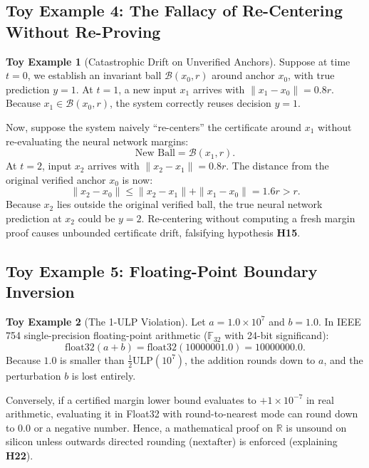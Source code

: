 \documentclass[11pt,article]{article}
\theoremstyle{definition}
\newtheorem{toyexample}{Toy Example}
\begin{document}
\subsection{Toy Example 4: The Fallacy of Re-Centering Without Re-Proving}
\begin{toyexample}[Catastrophic Drift on Unverified Anchors]
Suppose at time $t=0$, we establish an invariant ball $\mathcal{B}(x_0, r)$ around anchor $x_0$, with true prediction $y=1$.
At $t=1$, a new input $x_1$ arrives with $\|x_1 - x_0\| = 0.8r$.
Because $x_1 \in \mathcal{B}(x_0, r)$, the system correctly reuses decision $y=1$.

Now, suppose the system naively ``re-centers'' the certificate around $x_1$ without re-evaluating the neural network margins:
\begin{equation}
\text{New Ball} = \mathcal{B}(x_1, r).
\end{equation}
At $t=2$, input $x_2$ arrives with $\|x_2 - x_1\| = 0.8r$.
The distance from the original verified anchor $x_0$ is now:
\begin{equation}
\|x_2 - x_0\| \le \|x_2 - x_1\| + \|x_1 - x_0\| = 1.6r > r.
\end{equation}
Because $x_2$ lies outside the original verified ball, the true neural network prediction at $x_2$ could be $y=2$. Re-centering without computing a fresh margin proof causes unbounded certificate drift, falsifying hypothesis \textbf{H15}.
\end{toyexample}

\subsection{Toy Example 5: Floating-Point Boundary Inversion}
\begin{toyexample}[The 1-ULP Violation]
Let $a = 1.0 \times 10^7$ and $b = 1.0$.
In IEEE 754 single-precision floating-point arithmetic ($\mathbb{F}_{32}$ with 24-bit significand):
\begin{equation}
\text{float32}(a + b) = \text{float32}(10000001.0) = 10000000.0.
\end{equation}
Because $1.0$ is smaller than $\frac{1}{2}\text{ULP}(10^7)$, the addition rounds down to $a$, and the perturbation $b$ is lost entirely.

Conversely, if a certified margin lower bound evaluates to $+1 \times 10^{-7}$ in real arithmetic, evaluating it in Float32 with round-to-nearest mode can round down to $0.0$ or a negative number. Hence, a mathematical proof on $\mathbb{R}$ is unsound on silicon unless outwards directed rounding ($\text{nextafter}$) is enforced (explaining \textbf{H22}).
\end{toyexample}
\end{document}
